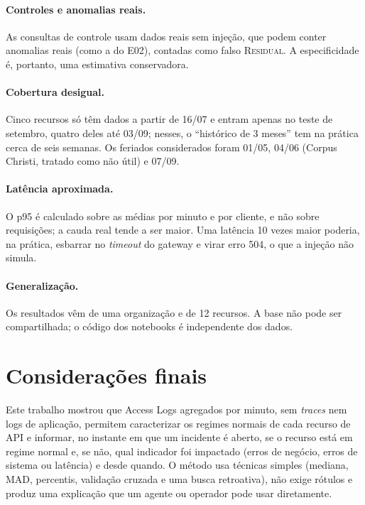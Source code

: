 \documentclass[sigconf,nonacm]{acmart}
\newcommand{\Residual}{\textsc{Residual}\xspace}
\begin{document}
\paragraph{Controles e anomalias reais.} As consultas de controle usam dados reais sem injeção, que podem conter anomalias reais (como a do E02), contadas como falso \Residual. A especificidade é, portanto, uma estimativa conservadora.

\paragraph{Cobertura desigual.} Cinco recursos só têm dados a partir de 16/07 e entram apenas no teste de setembro, quatro deles até 03/09; nesses, o ``histórico de 3 meses'' tem na prática cerca de seis semanas. Os feriados considerados foram 01/05, 04/06 (Corpus Christi, tratado como não útil) e 07/09.

\paragraph{Latência aproximada.} O p95 é calculado sobre as médias por minuto e por cliente, e não sobre requisições; a cauda real tende a ser maior. Uma latência 10 vezes maior poderia, na prática, esbarrar no \emph{timeout} do gateway e virar erro 504, o que a injeção não simula.

\paragraph{Generalização.} Os resultados vêm de uma organização e de 12 recursos. A base não pode ser compartilhada; o código dos notebooks é independente dos dados.

\section{Considerações finais}\label{sec:conclusao}

Este trabalho mostrou que Access Logs agregados por minuto, sem \emph{traces} nem logs de aplicação, permitem caracterizar os regimes normais de cada recurso de API e informar, no instante em que um incidente é aberto, se o recurso está em regime normal e, se não, qual indicador foi impactado (erros de negócio, erros de sistema ou latência) e desde quando. O método usa técnicas simples (mediana, MAD, percentis, validação cruzada e uma busca retroativa), não exige rótulos e produz uma explicação que um agente ou operador pode usar diretamente.
\end{document}
